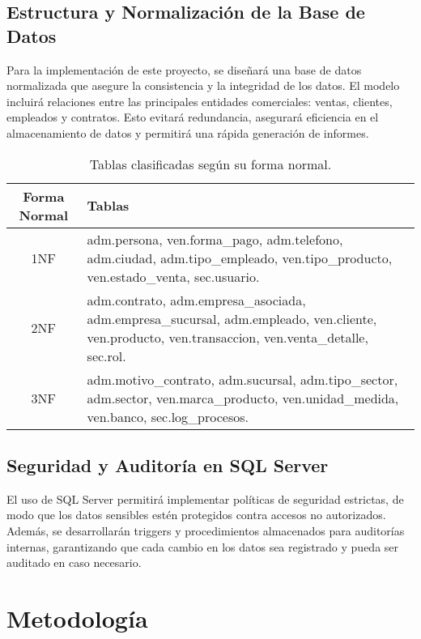 \documentclass[12pt]{article}
\begin{document}
\subsection{Estructura y Normalización de la Base de Datos}
Para la implementación de este proyecto, se diseñará una base de datos normalizada que asegure la consistencia y la integridad de los datos. El modelo incluirá relaciones entre las principales entidades comerciales: ventas, clientes, empleados y contratos. Esto evitará redundancia, asegurará eficiencia en el almacenamiento de datos y permitirá una rápida generación de informes.

\begin{table}[H]
    \centering
    \begin{tabular}{|c|p{10cm}|}
        \hline
        \textbf{Forma Normal} & \textbf{Tablas} \\ \hline
        1NF & 
        adm.persona, ven.forma\_pago, adm.telefono, adm.ciudad, adm.tipo\_empleado, ven.tipo\_producto, 
        ven.estado\_venta, sec.usuario. \\ \hline
        2NF & 
        adm.contrato, adm.empresa\_asociada, adm.empresa\_sucursal, adm.empleado, ven.cliente, 
        ven.producto, ven.transaccion, ven.venta\_detalle, sec.rol. \\ \hline
        3NF & 
        adm.motivo\_contrato, adm.sucursal, adm.tipo\_sector, adm.sector, ven.marca\_producto, 
        ven.unidad\_medida, ven.banco, sec.log\_procesos. \\ \hline
    \end{tabular}
    \caption{Tablas clasificadas según su forma normal.}
    \label{tab:formas-normales}
\end{table}


\subsection{Seguridad y Auditoría en SQL Server}
El uso de SQL Server permitirá implementar políticas de seguridad estrictas, de modo que los datos sensibles estén protegidos contra accesos no autorizados. Además, se desarrollarán triggers y procedimientos almacenados para auditorías internas, garantizando que cada cambio en los datos sea registrado y pueda ser auditado en caso necesario.

\section{Metodología}
\end{document}
